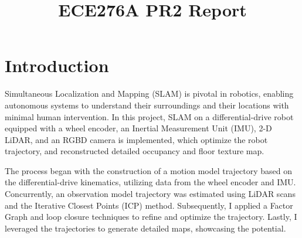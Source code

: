 \documentclass[conference]{IEEEtran}
\begin{document}
\title{ECE276A PR2 Report}

\author{
}

\maketitle


\section{Introduction}
Simultaneous Localization and Mapping (SLAM) is pivotal in robotics, 
enabling autonomous systems to understand their surroundings and their locations 
with minimal human intervention. 
In this project, SLAM on a differential-drive robot equipped with a wheel encoder, 
an Inertial Measurement Unit (IMU), 2-D LiDAR, and an RGBD camera is implemented,
which optimize the robot trajectory,  
and reconstructed detailed occupancy and floor texture map.

The process began with the construction of a motion model trajectory based on 
the differential-drive kinematics, 
utilizing data from the wheel encoder and IMU. 
Concurrently, an observation model trajectory was estimated using LiDAR scans 
and the Iterative Closest Points (ICP) method. 
Subsequently, I applied a Factor Graph and loop closure techniques to 
refine and optimize the trajectory. 
Lastly, I leveraged the trajectories to generate 
detailed maps, showcasing the potential.
\end{document}
